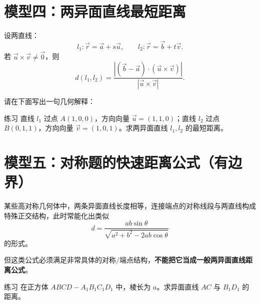 \documentclass[11pt,a4paper]{ctexart}
\begin{document}

\newpage

\section{模型四：两异面直线最短距离}

\begin{tcolorbox}[enhanced,colback=gray!5,colframe=black!60,boxrule=0.7pt,arc=1mm,title=\bfseries 统一公式]
设两直线：
\[
l_1: \vec r=\vec a+s\vec u,
\qquad
l_2: \vec r=\vec b+t\vec v.
\]
若 \(\vec u\times\vec v\neq\vec0\)，则
\[
\boxed{
 d(l_1,l_2)
 =
 \frac{|(\vec b-\vec a)\cdot(\vec u\times\vec v)|}{|\vec u\times\vec v|}
 }.
\]

请在下面写出一句几何解释：

\vspace{1.4cm}
\end{tcolorbox}

\begin{exbox}{练习}
直线 \(l_1\) 过点 \(A(1,0,0)\)，方向向量 \(\vec u=(1,1,0)\)；直线 \(l_2\) 过点 \(B(0,1,1)\)，方向向量 \(\vec v=(1,0,1)\)。求两异面直线 \(l_1,l_2\) 的最短距离。
\end{exbox}


\newpage

\section{模型五：对称题的快速距离公式（有边界）}

\begin{tcolorbox}[enhanced,colback=gray!5,colframe=black!60,boxrule=0.7pt,arc=1mm,title=\bfseries 快速公式不是万能公式]
某些高对称几何体中，两条异面直线长度相等，连接端点的对称线段与两直线构成特殊正交结构，此时常能化出类似
\[
d=\frac{ab\sin\theta}{\sqrt{a^2+b^2-2ab\cos\theta}}
\]
的形式。

但这类公式必须满足非常具体的对称/端点结构，\textbf{不能把它当成一般两异面直线距离公式}。
\end{tcolorbox}

\begin{exbox}{练习}
在正方体 \(ABCD-A_1B_1C_1D_1\) 中，棱长为 \(a\)。求异面直线 \(AC\) 与 \(B_1D_1\) 的距离。
\end{exbox}
\end{document}
